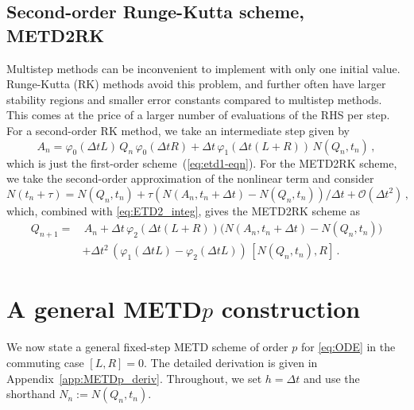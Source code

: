 \documentclass[12pt]{article}
\begin{document}
\subsection{Second-order Runge-Kutta scheme, METD2RK}

Multistep methods can be inconvenient to implement with only one initial value. Runge-Kutta (RK) methods avoid this problem, and further often have larger stability regions and smaller error constants compared to multistep methods. This comes at the price of a larger number of evaluations of the RHS per step. For a second-order RK method, we take an intermediate step given by 
\begin{equation*}
    A_{n} = \varphi_0(\Delta tL)\, Q_{n}\, \varphi_0(\Delta tR) + \Delta t \, \varphi_1(\Delta t(L+R))\, N(Q_{n}, t_n)\, ,
\end{equation*}
which is just the first-order scheme~(\ref{eq:etd1-eqn}). For the METD2RK scheme, we take the second-order approximation of the nonlinear
term and consider
\begin{equation*}
   N(t_n+\tau) = N(Q_{n}, t_n) +\tau (N(A_{n}, t_n + \Delta t) -  N(Q_{n}, t_n))/\Delta t+ \mathcal O(\Delta t^{2})\, ,
\end{equation*}
which, combined with \eqref{eq:ETD2_integ}, gives the METD2RK scheme as 
\begin{align*}
     Q_{n+1} =& \, A_{n} + \Delta t \, \varphi_2(\Delta t(L+R)) \big(N(A_{n}, t_n + \Delta t)- N(Q_{n}, t_n)\big) \\
     &+ \Delta t^2 \,(\varphi_1(\Delta t L)- \varphi_2(\Delta t L))\, [N(Q_{n}, t_n),R]\,.
\end{align*}

\section{A general METD\texorpdfstring{$p$}{p} construction}
\label{sec:metdp}

We now state a general fixed-step METD scheme of order $p$ for \eqref{eq:ODE} in the commuting case $[L,R]=0$.
The detailed derivation is given in Appendix~\ref{app:METDp_deriv}.
Throughout, we set $h=\Delta t$ and use the shorthand $N_n := N(Q_n,t_n)$.
\end{document}
